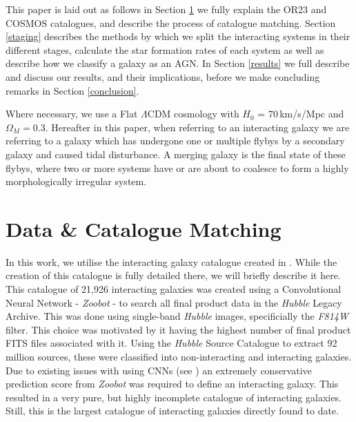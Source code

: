 \documentclass[fleqn,usenatbib]{mnras}
\begin{document}
 This paper is laid out as follows in Section \ref{data} we fully explain the OR23 and COSMOS catalogues, and describe the process of catalogue matching. Section \ref{staging} describes the methods by which we split the interacting systems in their different stages, calculate the star formation rates of each system as well as describe how we classify a galaxy as an AGN. In Section \ref{results} we full describe and discuss our results, and their implications, before we make concluding remarks in Section \ref{conclusion}. 

Where necessary, we use a Flat $\Lambda$CDM cosmology with $H_0$ = $70$\,km/s/Mpc and $\Omega_M = 0.3$. Hereafter in this paper, when referring to an interacting galaxy we are referring to a galaxy which has undergone one or multiple flybys by a secondary galaxy and caused tidal disturbance. A merging galaxy is the final state of these flybys, where two or more systems have or are about to coalesce to form a highly morphologically irregular system.

\section{Data \& Catalogue Matching} \label{data}
\noindent In this work, we utilise the interacting galaxy catalogue created in \citet{2023ApJ...948...40O}. While the creation of this catalogue is fully detailed there, we will briefly describe it here. This catalogue of 21,926 interacting galaxies was created using a Convolutional Neural Network - \textit{Zoobot} - to search all final product data in the \textit{Hubble} Legacy Archive. This was done using single-band \textit{Hubble} images, specificially the \textit{F814W} filter. This choice was motivated by it having the highest number of final product FITS files associated with it. Using the \textit{Hubble} Source Catalogue to extract 92 million sources, these were classified into non-interacting and interacting galaxies. Due to existing issues with using CNNs (see \citet{papers on problems with CNN}) an extremely conservative prediction score from \textit{Zoobot} was required to define an interacting galaxy. This resulted in a very pure, but highly incomplete catalogue of interacting galaxies. Still, this is the largest catalogue of interacting galaxies directly found to date.
\end{document}
